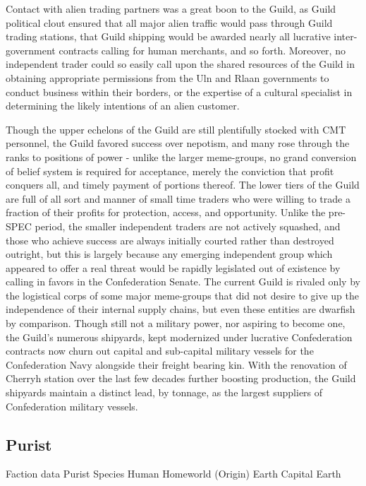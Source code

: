 Contact with alien trading partners was a great boon to the Guild, as
Guild political clout ensured that all major alien traffic would pass
through Guild trading stations, that Guild shipping would be awarded
nearly all lucrative inter-government contracts calling for human
merchants, and so forth. Moreover, no independent trader could so
easily call upon the shared resources of the Guild in obtaining
appropriate permissions from the Uln and Rlaan governments to conduct
business within their borders, or the expertise of a cultural
specialist in determining the likely intentions of an alien customer.

Though the upper echelons of the Guild are still plentifully stocked
with CMT personnel, the Guild favored success over nepotism, and many
rose through the ranks to positions of power - unlike the larger
meme-groups, no grand conversion of belief system is required for
acceptance, merely the conviction that profit conquers all, and timely
payment of portions thereof. The lower tiers of the Guild are full of
all sort and manner of small time traders who were willing to trade a
fraction of their profits for protection, access, and
opportunity. Unlike the pre-SPEC period, the smaller independent
traders are not actively squashed, and those who achieve success are
always initially courted rather than destroyed outright, but this is
largely because any emerging independent group which appeared to offer
a real threat would be rapidly legislated out of existence by calling
in favors in the Confederation Senate. The current Guild is rivaled
only by the logistical corps of some major meme-groups that did not
desire to give up the independence of their internal supply chains,
but even these entities are dwarfish by comparison. Though still not a
military power, nor aspiring to become one, the Guild's numerous
shipyards, kept modernized under lucrative Confederation contracts now
churn out capital and sub-capital military vessels for the
Confederation Navy alongside their freight bearing kin. With the
renovation of Cherryh station over the last few decades further
boosting production, the Guild shipyards maintain a distinct lead, by
tonnage, as the largest suppliers of Confederation military vessels.

\subsection{Purist}

Faction data 
Purist 
Species 	Human 
Homeworld (Origin) 	Earth 
Capital 	Earth 

